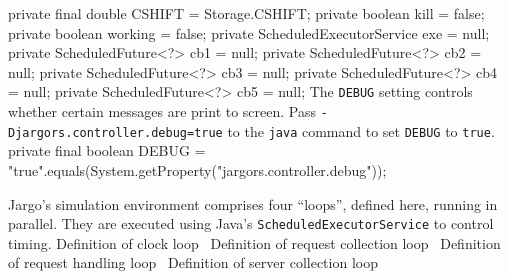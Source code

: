 \nwenddocs{}\plusendmoddef
private final double CSHIFT = Storage.CSHIFT;
private boolean kill = false;
private boolean working = false;
private ScheduledExecutorService exe = null;
private ScheduledFuture<?> cb1 = null;
private ScheduledFuture<?> cb2 = null;
private ScheduledFuture<?> cb3 = null;
private ScheduledFuture<?> cb4 = null;
private ScheduledFuture<?> cb5 = null;
\nwendcode{}\nwdocspar
The {\tt{}DEBUG} setting controls whether certain messages are print to screen.
Pass {\tt{}-Djargors.controller.debug=true} to the {\tt{}java} command to set
{\tt{}DEBUG} to {\tt{}true}.
\nwenddocs{}\plusendmoddef
private final boolean DEBUG =
    "true".equals(System.getProperty("jargors.controller.debug"));
\nwendcode{}\nwdocspar

 Jargo's simulation environment comprises four ``loops'', defined
here, running in parallel. They are executed using Java's
{\tt{}ScheduledExecutorService} to control timing.
\nwenddocs{}\endmoddef{}
\LA{}Definition of clock loop~{\nwtagstyle{}}\RA{}
\LA{}Definition of request collection loop~{\nwtagstyle{}}\RA{}
\LA{}Definition of request handling loop~{\nwtagstyle{}}\RA{}
\LA{}Definition of server collection loop~{\nwtagstyle{}}\RA{}
\nwendcode{}\nwdocspar

